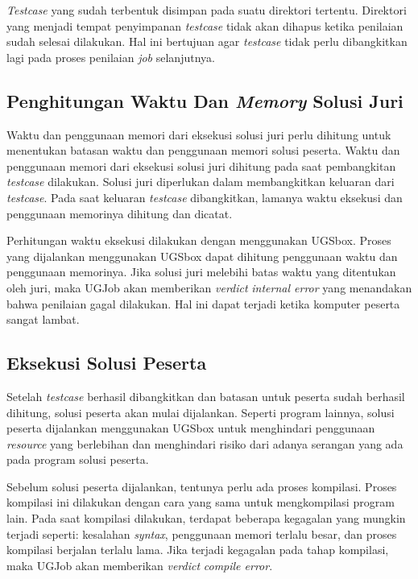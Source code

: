 \par \textit{Testcase} yang sudah terbentuk disimpan pada suatu direktori tertentu. Direktori yang menjadi tempat penyimpanan \textit{testcase} tidak akan dihapus ketika penilaian sudah selesai dilakukan. Hal ini bertujuan agar \textit{testcase} tidak perlu dibangkitkan lagi pada proses penilaian \textit{job} selanjutnya.

\subsection{Penghitungan Waktu Dan \textit{Memory} Solusi Juri} 

\par Waktu dan penggunaan memori dari eksekusi solusi juri perlu dihitung untuk menentukan batasan waktu dan penggunaan memori solusi peserta. Waktu dan penggunaan memori dari eksekusi solusi juri dihitung pada saat pembangkitan \textit{testcase} dilakukan. Solusi juri diperlukan dalam membangkitkan keluaran dari \textit{testcase}. Pada saat keluaran \textit{testcase} dibangkitkan, lamanya waktu eksekusi dan penggunaan memorinya dihitung dan dicatat.

\par Perhitungan waktu eksekusi dilakukan dengan menggunakan UGSbox. Proses yang dijalankan menggunakan UGSbox dapat dihitung penggunaan waktu dan penggunaan memorinya. Jika solusi juri melebihi batas waktu yang ditentukan oleh juri, maka UGJob akan memberikan \textit{verdict} \textit{internal error} yang menandakan bahwa penilaian gagal dilakukan. Hal ini dapat terjadi ketika komputer peserta sangat lambat.

\subsection{Eksekusi Solusi Peserta}

\par Setelah \textit{testcase} berhasil dibangkitkan dan batasan untuk peserta sudah berhasil dihitung, solusi peserta akan mulai dijalankan. Seperti program lainnya, solusi peserta dijalankan menggunakan UGSbox untuk menghindari penggunaan \textit{resource} yang berlebihan dan menghindari risiko dari adanya serangan yang ada pada program solusi peserta.

\par Sebelum solusi peserta dijalankan, tentunya perlu ada proses kompilasi. Proses kompilasi ini dilakukan dengan cara yang sama untuk mengkompilasi program lain. Pada saat kompilasi dilakukan, terdapat beberapa kegagalan yang mungkin terjadi seperti: kesalahan \textit{syntax}, penggunaan memori terlalu besar, dan proses kompilasi berjalan terlalu lama. Jika terjadi kegagalan pada tahap kompilasi, maka UGJob akan memberikan \textit{verdict} \textit{compile error}.

